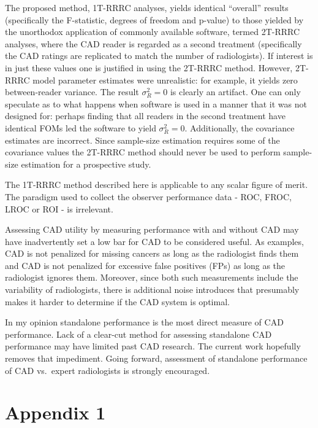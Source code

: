\documentclass[
]{book}
\begin{document}
The proposed method, 1T-RRRC analyses, yields identical ``overall'' results (specifically the F-statistic, degrees of freedom and p-value) to those yielded by the unorthodox application of commonly available software, termed 2T-RRRC analyses, where the CAD reader is regarded as a second treatment (specifically the CAD ratings are replicated to match the number of radiologists). If interest is in just these values one is justified in using the 2T-RRRC method. However, 2T-RRRC model parameter estimates were unrealistic: for example, it yields zero between-reader variance. The result \(\sigma_R^2 = 0\) is clearly an artifact. One can only speculate as to what happens when software is used in a manner that it was not designed for: perhaps finding that all readers in the second treatment have identical FOMs led the software to yield \(\sigma_R^2 = 0\). Additionally, the covariance estimates are incorrect. Since sample-size estimation requires some of the covariance values the 2T-RRRC method should never be used to perform sample-size estimation for a prospective study.

The 1T-RRRC method described here is applicable to any scalar figure of merit. The paradigm used to collect the observer performance data - ROC, FROC, LROC or ROI - is irrelevant.

Assessing CAD utility by measuring performance with and without CAD may have inadvertently set a low bar for CAD to be considered useful. As examples, CAD is not penalized for missing cancers as long as the radiologist finds them and CAD is not penalized for excessive false positives (FPs) as long as the radiologist ignores them. Moreover, since both such measurements include the variability of radiologists, there is additional noise introduces that presumably makes it harder to determine if the CAD system is optimal.

In my opinion standalone performance is the most direct measure of CAD performance. Lack of a clear-cut method for assessing standalone CAD performance may have limited past CAD research. The current work hopefully removes that impediment. Going forward, assessment of standalone performance of CAD vs.~expert radiologists is strongly encouraged.

\hypertarget{standalone-cad-radiologists-appendix1}{%
\section{Appendix 1}\label{standalone-cad-radiologists-appendix1}}
\end{document}
